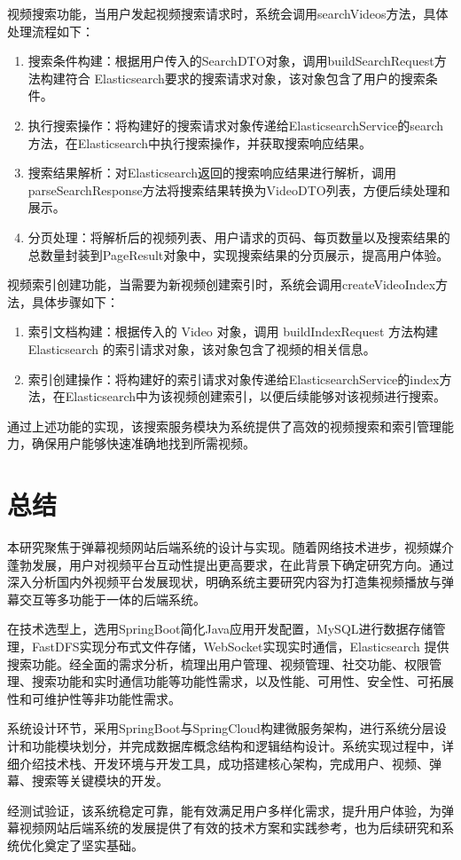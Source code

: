 视频搜索功能，当用户发起视频搜索请求时，系统会调用searchVideos方法，具体处理流程如下：
\begin{enumerate}[label=(\arabic*)]
    \item 搜索条件构建：根据用户传入的SearchDTO对象，调用buildSearchRequest方法构建符合 Elasticsearch要求的搜索请求对象，该对象包含了用户的搜索条件。
    \item 执行搜索操作：将构建好的搜索请求对象传递给ElasticsearchService的search方法，在Elasticsearch中执行搜索操作，并获取搜索响应结果。
    \item 搜索结果解析：对Elasticsearch返回的搜索响应结果进行解析，调用parseSearchResponse方法将搜索结果转换为VideoDTO列表，方便后续处理和展示。
    \item 分页处理：将解析后的视频列表、用户请求的页码、每页数量以及搜索结果的总数量封装到PageResult对象中，实现搜索结果的分页展示，提高用户体验。
\end{enumerate}

视频索引创建功能，当需要为新视频创建索引时，系统会调用createVideoIndex方法，具体步骤如下：
\begin{enumerate}[label=(\arabic*)]
    \item 索引文档构建：根据传入的 Video 对象，调用 buildIndexRequest 方法构建 Elasticsearch 的索引请求对象，该对象包含了视频的相关信息。
    \item 索引创建操作：将构建好的索引请求对象传递给ElasticsearchService的index方法，在Elasticsearch中为该视频创建索引，以便后续能够对该视频进行搜索。
\end{enumerate}

通过上述功能的实现，该搜索服务模块为系统提供了高效的视频搜索和索引管理能力，确保用户能够快速准确地找到所需视频。

\newpage

\section{总结}

本研究聚焦于弹幕视频网站后端系统的设计与实现。随着网络技术进步，视频媒介蓬勃发展，用户对视频平台互动性提出更高要求，在此背景下确定研究方向。通过深入分析国内外视频平台发展现状，明确系统主要研究内容为打造集视频播放与弹幕交互等多功能于一体的后端系统。

在技术选型上，选用SpringBoot简化Java应用开发配置，MySQL进行数据存储管理，FastDFS实现分布式文件存储，WebSocket实现实时通信，Elasticsearch 提供搜索功能。经全面的需求分析，梳理出用户管理、视频管理、社交功能、权限管理、搜索功能和实时通信功能等功能性需求，以及性能、可用性、安全性、可拓展性和可维护性等非功能性需求。

系统设计环节，采用SpringBoot与SpringCloud构建微服务架构，进行系统分层设计和功能模块划分，并完成数据库概念结构和逻辑结构设计。系统实现过程中，详细介绍技术栈、开发环境与开发工具，成功搭建核心架构，完成用户、视频、弹幕、搜索等关键模块的开发。

经测试验证，该系统稳定可靠，能有效满足用户多样化需求，提升用户体验，为弹幕视频网站后端系统的发展提供了有效的技术方案和实践参考，也为后续研究和系统优化奠定了坚实基础。

\newpage


